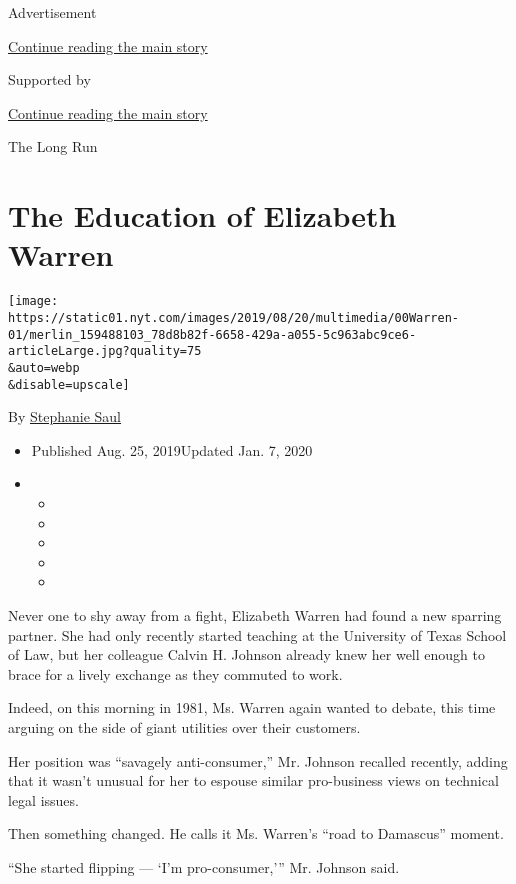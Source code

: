 Advertisement

\protect\hyperlink{after-top}{Continue reading the main story}

Supported by

\protect\hyperlink{after-sponsor}{Continue reading the main story}

The Long Run

\hypertarget{the-education-of-elizabeth-warren}{%
\section{The Education of Elizabeth
Warren}\label{the-education-of-elizabeth-warren}}

\texttt{[image: https://static01.nyt.com/images/2019/08/20/multimedia/00Warren-01/merlin\_159488103\_78d8b82f-6658-429a-a055-5c963abc9ce6-articleLarge.jpg?quality=75\\\&auto=webp\\\&disable=upscale]}

By \href{https://www.nytimes.com/by/stephanie-saul}{Stephanie Saul}

\begin{itemize}
\item
  Published Aug. 25, 2019Updated Jan. 7, 2020
\item
  \begin{itemize}
  \item
  \item
  \item
  \item
  \item
  \end{itemize}
\end{itemize}

Never one to shy away from a fight, Elizabeth Warren had found a new
sparring partner. She had only recently started teaching at the
University of Texas School of Law, but her colleague Calvin H. Johnson
already knew her well enough to brace for a lively exchange as they
commuted to work.

Indeed, on this morning in 1981, Ms. Warren again wanted to debate, this
time arguing on the side of giant utilities over their customers.

Her position was ``savagely anti-consumer,'' Mr. Johnson recalled
recently, adding that it wasn't unusual for her to espouse similar
pro-business views on technical legal issues.

Then something changed. He calls it Ms. Warren's ``road to Damascus''
moment.

``She started flipping --- `I'm pro-consumer,''' Mr. Johnson said.

